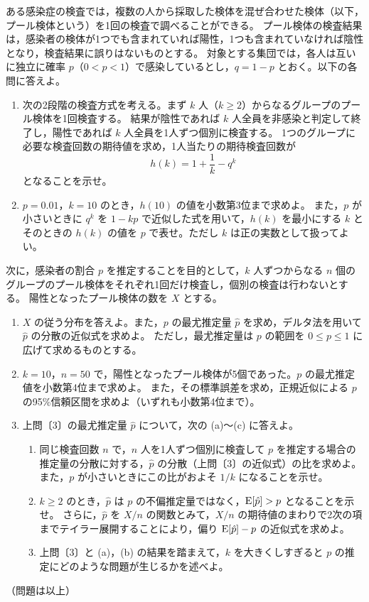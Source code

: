 \documentclass[a4paper,10pt]{ltjsarticle}
\begin{document}
ある感染症の検査では，複数の人から採取した検体を混ぜ合わせた検体（以下，プール検体という）を1回の検査で調べることができる。
プール検体の検査結果は，感染者の検体が1つでも含まれていれば陽性，1つも含まれていなければ陰性となり，検査結果に誤りはないものとする。
対象とする集団では，各人は互いに独立に確率 $p$（$0<p<1$）で感染しているとし，$q=1-p$ とおく。以下の各問に答えよ。
\begin{enumerate}
\item 次の2段階の検査方式を考える。まず $k$ 人（$k\ge2$）からなるグループのプール検体を1回検査する。
結果が陰性であれば $k$ 人全員を非感染と判定して終了し，陽性であれば $k$ 人全員を1人ずつ個別に検査する。
1つのグループに必要な検査回数の期待値を求め，1人当たりの期待検査回数が
\[
h(k)=1+\frac1k-q^k
\]
となることを示せ。
\item $p=0.01$，$k=10$ のとき，$h(10)$ の値を小数第3位まで求めよ。
また，$p$ が小さいときに $q^k$ を $1-kp$ で近似した式を用いて，$h(k)$ を最小にする $k$ とそのときの $h(k)$ の値を $p$ で表せ。ただし $k$ は正の実数として扱ってよい。
\end{enumerate}
次に，感染者の割合 $p$ を推定することを目的として，$k$ 人ずつからなる $n$ 個のグループのプール検体をそれぞれ1回だけ検査し，個別の検査は行わないとする。
陽性となったプール検体の数を $X$ とする。
\begin{enumerate}[resume]
\item $X$ の従う分布を答えよ。また，$p$ の最尤推定量 $\hat p$ を求め，デルタ法を用いて $\hat p$ の分散の近似式を求めよ。
ただし，最尤推定量は $p$ の範囲を $0\le p\le1$ に広げて求めるものとする。
\item $k=10$，$n=50$ で，陽性となったプール検体が5個であった。$p$ の最尤推定値を小数第4位まで求めよ。
また，その標準誤差を求め，正規近似による $p$ の95\%信頼区間を求めよ（いずれも小数第4位まで）。
\item 上問〔3〕の最尤推定量 $\hat p$ について，次の (a)〜(c) に答えよ。
\begin{enumerate}[label=(\alph*),leftmargin=2em,itemsep=0.3em,topsep=0.3em]
\item 同じ検査回数 $n$ で，$n$ 人を1人ずつ個別に検査して $p$ を推定する場合の推定量の分散に対する，$\hat p$ の分散（上問〔3〕の近似式）の比を求めよ。
また，$p$ が小さいときにこの比がおよそ $1/k$ になることを示せ。
\item $k\ge2$ のとき，$\hat p$ は $p$ の不偏推定量ではなく，$\operatorname{E}[\hat p]>p$ となることを示せ。
さらに，$\hat p$ を $X/n$ の関数とみて，$X/n$ の期待値のまわりで2次の項までテイラー展開することにより，偏り $\operatorname{E}[\hat p]-p$ の近似式を求めよ。
\item 上問〔3〕と (a)，(b) の結果を踏まえて，$k$ を大きくしすぎると $p$ の推定にどのような問題が生じるかを述べよ。
\end{enumerate}
\end{enumerate}
\vfill
\begin{center}（問題は以上）\end{center}
\end{document}
